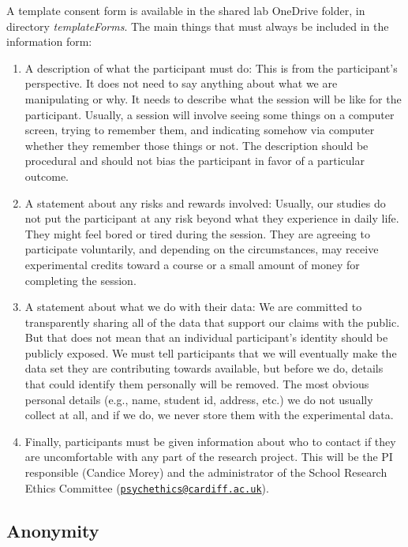 \documentclass[12pt,]{book}
\theoremstyle{definition}
\theoremstyle{definition}
\theoremstyle{definition}
\theoremstyle{remark}
\begin{document}
A template consent form is available in the shared lab OneDrive folder,
in directory \emph{templateForms}. The main things that must always be
included in the information form:

\begin{enumerate}
\def\labelenumi{\arabic{enumi}.}
\item
  A description of what the participant must do: This is from the
  participant's perspective. It does not need to say anything about what
  we are manipulating or why. It needs to describe what the session will
  be like for the participant. Usually, a session will involve seeing
  some things on a computer screen, trying to remember them, and
  indicating somehow via computer whether they remember those things or
  not. The description should be procedural and should not bias the
  participant in favor of a particular outcome.
\item
  A statement about any risks and rewards involved: Usually, our studies
  do not put the participant at any risk beyond what they experience in
  daily life. They might feel bored or tired during the session. They
  are agreeing to participate voluntarily, and depending on the
  circumstances, may receive experimental credits toward a course or a
  small amount of money for completing the session.
\item
  A statement about what we do with their data: We are committed to
  transparently sharing all of the data that support our claims with the
  public. But that does not mean that an individual participant's
  identity should be publicly exposed. We must tell participants that we
  will eventually make the data set they are contributing towards
  available, but before we do, details that could identify them
  personally will be removed. The most obvious personal details (e.g.,
  name, student id, address, etc.) we do not usually collect at all, and
  if we do, we never store them with the experimental data.
\item
  Finally, participants must be given information about who to contact
  if they are uncomfortable with any part of the research project. This
  will be the PI responsible (Candice Morey) and the administrator of
  the School Research Ethics Committee
  (\href{mailto:psychethics@cardiff.ac.uk}{\nolinkurl{psychethics@cardiff.ac.uk}}).
\end{enumerate}

\subsection{Anonymity}\label{anonymity}
\end{document}
